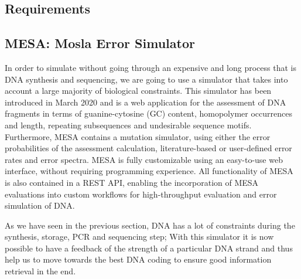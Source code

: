 \subsection{Requirements}

\tocontinue{}

\subsection{MESA: Mosla Error Simulator}

In order to simulate without going through an expensive and long process that is DNA synthesis and sequencing, we are going to use a simulator that takes into account a large majority of biological constraints.
This simulator has been introduced \cite{bib:10.1093/bioinformatics/btaa140} in March 2020 and is a web application for the assessment of DNA fragments in terms of guanine-cytosine (GC) content, homopolymer occurrences and length, repeating subsequences and undesirable sequence motifs.
Furthermore, MESA contains a mutation simulator, using either the error probabilities of the assessment calculation, literature-based or user-defined error rates and error spectra. MESA is fully customizable using an easy-to-use web interface, without requiring programming experience. All functionality of MESA is also contained in a REST API, enabling the incorporation of MESA evaluations into custom workflows for high-throughput evaluation and error simulation of DNA.

As we have seen in the previous section, DNA has a lot of constraints during the synthesis, storage, PCR and sequencing step; With this simulator it is now possible to have a feedback of the strength of a particular DNA strand and thus help us to move towards the best DNA coding to ensure good information retrieval in the end.

\tocontinue{}
